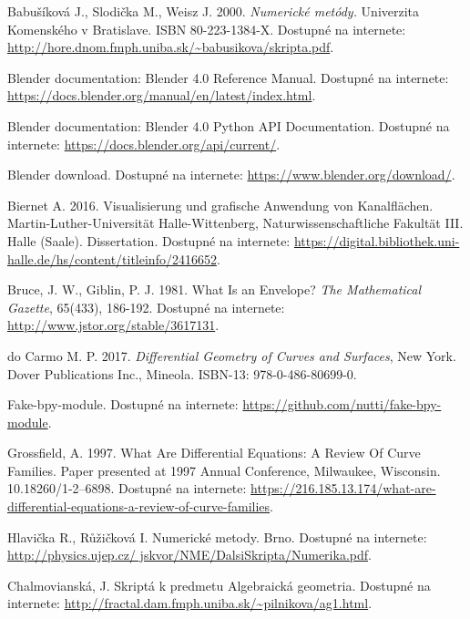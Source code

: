\documentclass[12pt, twoside]{book}
\theoremstyle{definition}
\begin{document}
\begin{thebibliography}{99}

 Babušíková J., Slodička M., Weisz J. 2000. \textit{Numerické metódy.} Univerzita Komenského v Bratislave. ISBN 80-223-1384-X. Dostupné na internete: \url{http://hore.dnom.fmph.uniba.sk/~babusikova/skripta.pdf}.

 Blender documentation: Blender 4.0 Reference Manual. Dostupné na internete: \url{https://docs.blender.org/manual/en/latest/index.html}.

 Blender documentation: Blender 4.0 Python API Documentation. Dostupné na internete: \url{https://docs.blender.org/api/current/}.

 Blender download. Dostupné na internete: \url{https://www.blender.org/download/}.

 Biernet A. 2016. Visualisierung und grafische Anwendung von Kanalflächen. Martin-Luther-Universität Halle-Wittenberg, Naturwissenschaftliche Fakultät III. Halle (Saale). Dissertation. Dostupné na internete: \url{https://digital.bibliothek.uni-halle.de/hs/content/titleinfo/2416652}.

 Bruce, J. W., Giblin, P. J. 1981. What Is an Envelope? \textit{The Mathematical Gazette}, 65(433), 186-192. Dostupné na internete: \url{http://www.jstor.org/stable/3617131}.

 do Carmo M. P. 2017. \textit{Differential Geometry of Curves and Surfaces}, New York. Dover Publications Inc., Mineola. ISBN-13: 978-0-486-80699-0.

 Fake-bpy-module. Dostupné na internete: \url{https://github.com/nutti/fake-bpy-module}.

 Grossfield, A. 1997. What Are Differential Equations: A Review Of Curve Families. Paper presented at 1997 Annual Conference, Milwaukee, Wisconsin. 10.18260/1-2--6898. Dostupné na internete: \url{https://216.185.13.174/what-are-differential-equations-a-review-of-curve-families}.

 Hlavička R., Růžičková I. Numerické metody. Brno. Dostupné na internete: \url{http://physics.ujep.cz/ jskvor/NME/DalsiSkripta/Numerika.pdf}.

 Chalmovianská, J. Skriptá k predmetu Algebraická geometria. Dostupné na internete: \url{http://fractal.dam.fmph.uniba.sk/~pilnikova/ag1.html}.


\end{thebibliography}
\end{document}
